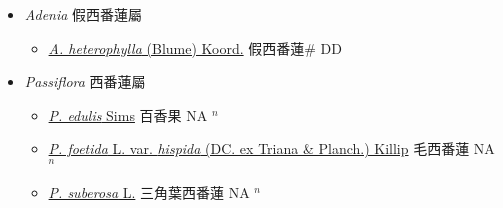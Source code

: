 
  \begin{itemize}
 \item[] \textit{Adenia} 假西番蓮屬
                    
  \begin{itemize}
        \item[] \href{http://www.theplantlist.org/tpl1.1/search?q=Adenia+heterophylla}{\textit{A. heterophylla} (Blume) Koord.}   假西番蓮\# DD
  \end{itemize}
 \item[] \textit{Passiflora} 西番蓮屬
                    
  \begin{itemize}
        \item[] \href{http://www.theplantlist.org/tpl1.1/search?q=Passiflora+edulis}{\textit{P. edulis} Sims}   百香果 NA $^n$
        \item[] \href{http://www.theplantlist.org/tpl1.1/search?q=Passiflora+foetida+var.+hispida}{\textit{P. foetida} L. var. \textit{hispida} (DC. ex Triana \& Planch.) Killip}   毛西番蓮 NA $^n$
        \item[] \href{http://www.theplantlist.org/tpl1.1/search?q=Passiflora+suberosa}{\textit{P. suberosa} L.}   三角葉西番蓮 NA $^n$
  \end{itemize}
  \end{itemize}
